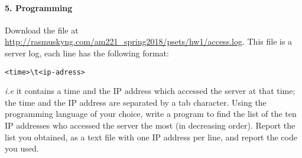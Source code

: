 \documentclass[11pt]{article}
\begin{document}
\paragraph{5. Programming}

Download the file at \url{http://rasmuskyng.com/am221_spring2018/psets/hw1/access.log}. This file is
a server log, each line has the following format:
\begin{center}
    \begin{verbatim}<time>\t<ip-adress>\end{verbatim}
\end{center}
\emph{i.e} it contains a time and the IP address which accessed the server at
that time; the time and the IP address are separated by a tab character. Using
the programming language of your choice, write a program to find the list of
the ten IP addresses who accessed the server the most (in decreasing order). 
Report the list you obtained, as a text file with one IP address
per line, and report the code you used.
\end{document}
